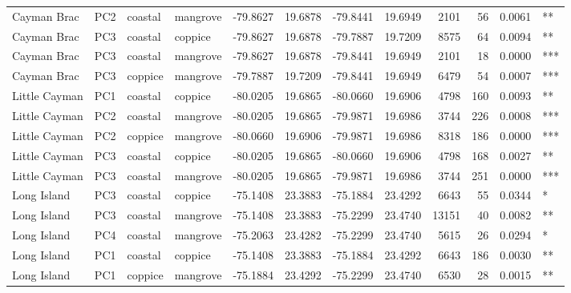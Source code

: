 \begin{tabular}{llllrrrrrrrl}
Cayman Brac & PC2 & coastal & mangrove & -79.8627 & 19.6878 & -79.8441 & 19.6949 & 2101 & 56 & 0.0061 & **\\
Cayman Brac & PC3 & coastal & coppice & -79.8627 & 19.6878 & -79.7887 & 19.7209 & 8575 & 64 & 0.0094 & **\\
Cayman Brac & PC3 & coastal & mangrove & -79.8627 & 19.6878 & -79.8441 & 19.6949 & 2101 & 18 & 0.0000 & ***\\
\addlinespace
Cayman Brac & PC3 & coppice & mangrove & -79.7887 & 19.7209 & -79.8441 & 19.6949 & 6479 & 54 & 0.0007 & ***\\
Little Cayman & PC1 & coastal & coppice & -80.0205 & 19.6865 & -80.0660 & 19.6906 & 4798 & 160 & 0.0093 & **\\
Little Cayman & PC2 & coastal & mangrove & -80.0205 & 19.6865 & -79.9871 & 19.6986 & 3744 & 226 & 0.0008 & ***\\
Little Cayman & PC2 & coppice & mangrove & -80.0660 & 19.6906 & -79.9871 & 19.6986 & 8318 & 186 & 0.0000 & ***\\
Little Cayman & PC3 & coastal & coppice & -80.0205 & 19.6865 & -80.0660 & 19.6906 & 4798 & 168 & 0.0027 & **\\
\addlinespace
Little Cayman & PC3 & coastal & mangrove & -80.0205 & 19.6865 & -79.9871 & 19.6986 & 3744 & 251 & 0.0000 & ***\\
Long Island & PC3 & coastal & coppice & -75.1408 & 23.3883 & -75.1884 & 23.4292 & 6643 & 55 & 0.0344 & *\\
Long Island & PC3 & coastal & mangrove & -75.1408 & 23.3883 & -75.2299 & 23.4740 & 13151 & 40 & 0.0082 & **\\
Long Island & PC4 & coastal & mangrove & -75.2063 & 23.4282 & -75.2299 & 23.4740 & 5615 & 26 & 0.0294 & *\\
Long Island & PC1 & coastal & coppice & -75.1408 & 23.3883 & -75.1884 & 23.4292 & 6643 & 186 & 0.0030 & **\\
\addlinespace
Long Island & PC1 & coppice & mangrove & -75.1884 & 23.4292 & -75.2299 & 23.4740 & 6530 & 28 & 0.0015 & **\\
\bottomrule
\end{tabular}
